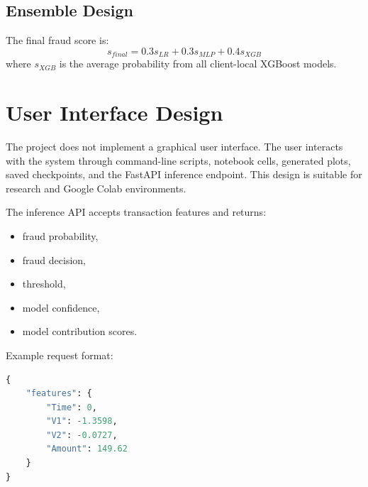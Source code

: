 \subsection{Ensemble Design}
The final fraud score is:
\begin{equation}
s_{final} = 0.3s_{LR} + 0.3s_{MLP} + 0.4s_{XGB}
\end{equation}
where $s_{XGB}$ is the average probability from all client-local XGBoost models.

\section{User Interface Design}
The project does not implement a graphical user interface. The user interacts with the system through command-line scripts, notebook cells, generated plots, saved checkpoints, and the FastAPI inference endpoint. This design is suitable for research and Google Colab environments.

The inference API accepts transaction features and returns:
\begin{itemize}
    \item fraud probability,
    \item fraud decision,
    \item threshold,
    \item model confidence,
    \item model contribution scores.
\end{itemize}

Example request format:
\begin{lstlisting}[language=Python, caption={Example API Payload}]
{
    "features": {
        "Time": 0,
        "V1": -1.3598,
        "V2": -0.0727,
        "Amount": 149.62
    }
}
\end{lstlisting}

